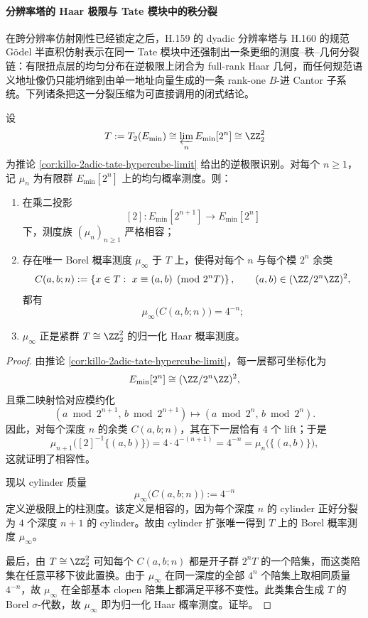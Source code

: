 \paragraph{分辨率塔的 Haar 极限与 Tate 模块中的秩分裂}
在跨分辨率仿射刚性已经锁定之后，H.159 的 dyadic 分辨率塔与 H.160 的规范 Gödel 半直积仿射表示在同一 Tate 模块中还强制出一条更细的测度--秩--几何分裂链：有限扭点层的均匀分布在逆极限上闭合为 full-rank Haar 几何，而任何规范语义地址像仍只能坍缩到由单一地址向量生成的一条 rank-one \(B\)-进 Cantor 子系统。下列诸条把这一分裂压缩为可直接调用的闭式结论。

\begin{theorem}\label{thm:xi-time-part9gc-resolution-tower-haar-limit}
设
\[
T:=T_2(E_{\min})
\cong
\varprojlim_n E_{\min}[2^n]
\cong
\ZZ_2^2
\]
为推论 \ref{cor:killo-2adic-tate-hypercube-limit} 给出的逆极限识别。对每个 \(n\ge 1\)，记 \(\mu_n\) 为有限群 \(E_{\min}[2^n]\) 上的均匀概率测度。则：
\begin{enumerate}
  \item 在乘二投影
  \[
  [2]:E_{\min}[2^{n+1}]\longrightarrow E_{\min}[2^n]
  \]
  下，测度族 \((\mu_n)_{n\ge 1}\) 严格相容；
  \item 存在唯一 Borel 概率测度 \(\mu_\infty\) 于 \(T\) 上，使得对每个 \(n\) 与每个模 \(2^n\) 余类
  \[
  C(a,b;n):=
  \left\{
  x\in T:\ x\equiv (a,b)\pmod{2^nT}
  \right\},
  \qquad
  (a,b)\in (\ZZ/2^n\ZZ)^2,
  \]
  都有
  \[
  \mu_\infty\bigl(C(a,b;n)\bigr)=4^{-n};
  \]
  \item \(\mu_\infty\) 正是紧群 \(T\cong \ZZ_2^2\) 的归一化 Haar 概率测度。
\end{enumerate}
\end{theorem}
\begin{proof}
由推论 \ref{cor:killo-2adic-tate-hypercube-limit}，每一层都可坐标化为
\[
E_{\min}[2^n]\cong (\ZZ/2^n\ZZ)^2,
\]
且乘二映射恰对应模约化
\[
(a\bmod 2^{n+1},\,b\bmod 2^{n+1})
\longmapsto
(a\bmod 2^n,\,b\bmod 2^n).
\]
因此，对每个深度 \(n\) 的余类 \(C(a,b;n)\)，其在下一层恰有 \(4\) 个 lift；于是
\[
\mu_{n+1}\bigl([2]^{-1}\{(a,b)\}\bigr)
=
4\cdot 4^{-(n+1)}
=
4^{-n}
=
\mu_n\bigl(\{(a,b)\}\bigr),
\]
这就证明了相容性。

现以 cylinder 质量
\[
\mu_\infty\bigl(C(a,b;n)\bigr):=4^{-n}
\]
定义逆极限上的柱测度。该定义是相容的，因为每个深度 \(n\) 的 cylinder 正好分裂为 \(4\) 个深度 \(n+1\) 的 cylinder。故由 cylinder 扩张唯一得到 \(T\) 上的 Borel 概率测度 \(\mu_\infty\)。

最后，由 \(T\cong \ZZ_2^2\) 可知每个 \(C(a,b;n)\) 都是开子群 \(2^nT\) 的一个陪集，而这类陪集在任意平移下彼此置换。由于 \(\mu_\infty\) 在同一深度的全部 \(4^n\) 个陪集上取相同质量 \(4^{-n}\)，故 \(\mu_\infty\) 在全部基本 clopen 陪集上都满足平移不变性。此类集合生成 \(T\) 的 Borel \(\sigma\)-代数，故 \(\mu_\infty\) 即为归一化 Haar 概率测度。证毕。
\end{proof}

